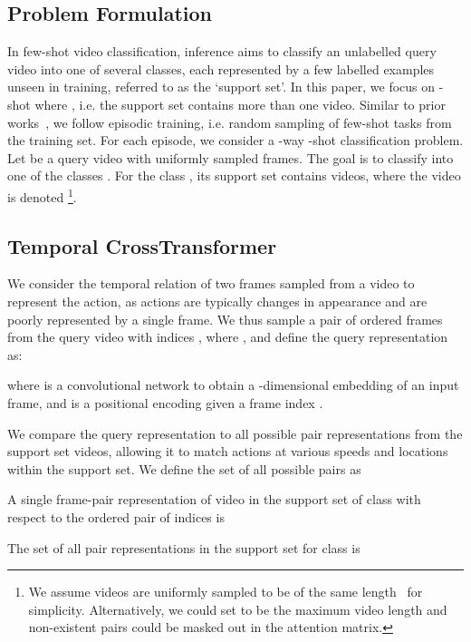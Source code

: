 \documentclass[final]{cvpr}
\begin{document}
\subsection{Problem Formulation}\label{sec:prob_def}
In few-shot video classification, inference aims to classify an unlabelled query video into one of several classes, each represented by a few labelled examples unseen in training, referred to as the `support set'. In this paper, we focus on -shot where , i.e. the support set contains more than one video.
Similar to prior works~\cite{Vinyals2016,Finn2017,Cao2020,Zhang2020}, we follow episodic training, i.e. 
random sampling of few-shot tasks from the training set.
For each episode, we consider a -way -shot classification problem.  Let  be a query video with  uniformly sampled frames. 
The goal is to classify  into one of the classes . 
For the class , its support set  contains  videos, where the  video is denoted \footnote{We assume videos are uniformly sampled to be of the same length~ for simplicity.  Alternatively, we could set  to be the maximum video length and non-existent pairs could be masked out in the attention matrix.}. 

\subsection{Temporal CrossTransformer}\label{sec:single_pair}

We consider the temporal relation of two frames sampled from a video to represent the action, as actions are typically changes in appearance and are poorly represented by a single frame.  
We thus sample a pair of ordered frames from the query video with indices , where , and define the query representation as: 

where  is a convolutional network to obtain a -dimensional embedding of an input frame, and  is a positional encoding given a frame index \cite{Vaswani2017}.

We compare the query representation  to all possible pair representations from the support set videos, allowing it to match actions at various speeds and locations within the support set. 
We define the set of all possible pairs as 
\vspace{-3pt}

A single frame-pair representation of video  in the support set of class  with respect to the ordered pair of indices  is 
\vspace{-1pt}

The set of all pair representations in the support set for class  is
\vspace{-2pt}
\end{document}
